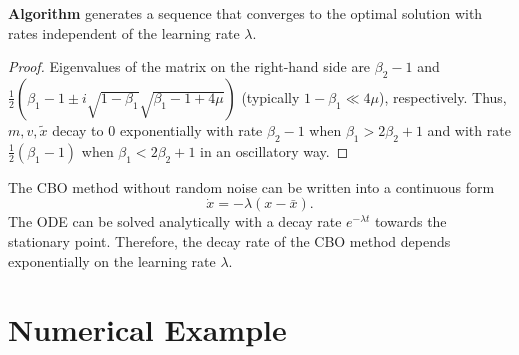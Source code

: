 \documentclass{beamer}
\begin{document}
\begin{frame}
\begin{theorem}
	\textbf{Algorithm} generates a sequence that converges to the optimal solution with rates independent of the learning rate $\lambda$. 
	\begin{proof}
	Eigenvalues of the matrix on the right-hand side are $\beta_2-1$ and $\frac{1}{2}( \beta_1 - 1 \pm i  \sqrt{1-\beta_1}\sqrt{\beta_1-1+4\mu})$ (typically $1-\beta_1\ll 4\mu$), respectively. Thus, $m,v,\tilde{x}$ decay to $0$  exponentially with rate $\beta_2 -1 $ when $\beta_1>2\beta_2+1$ and with rate $\frac{1}{2}(\beta_1-1)$ when $\beta_1 < 2 \beta_2 + 1$ in an oscillatory way. 
	\end{proof}
\end{theorem} 	
\end{frame}
\begin{frame}
The CBO method without random noise can be written into a continuous form
\begin{equation}
\dot x = - \lambda (x- \bar{x}).
\end{equation}
The ODE can be solved analytically with a decay rate $e^{-\lambda t }$ towards the stationary point.
Therefore, the decay rate of the CBO method depends exponentially on the learning rate $\lambda$.
\end{frame}

\section{Numerical Example}
\end{document}
